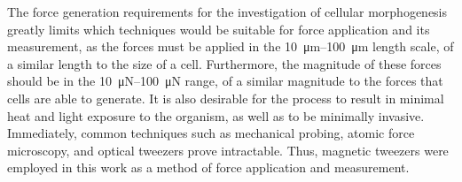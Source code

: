 The force generation requirements for the investigation of cellular morphogenesis greatly limits which techniques would be suitable for force application and its measurement, as the forces must be applied in the \SIrange{10}{100}{\micro\metre} length scale, of a similar length to the size of a cell.
Furthermore, the magnitude of these forces should be in the \SIrange{10}{100}{\micro\newton} range, of a similar magnitude to the forces that cells are able to generate. %
It is also desirable for the process to result in minimal heat and light exposure to the organism, as well as to be minimally invasive.
Immediately, common techniques such as mechanical probing, atomic force microscopy, and optical tweezers prove intractable.
Thus, magnetic tweezers were employed in this work as a method of force application and measurement.


